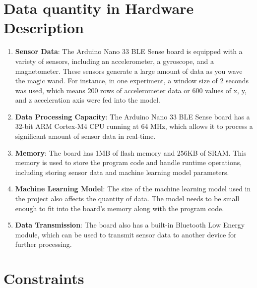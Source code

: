 \section{Data quantity in Hardware Description}

\begin{enumerate}
	\item \textbf{Sensor Data}: The Arduino Nano 33 BLE Sense board is equipped with a variety of sensors, including an accelerometer, a gyroscope, and a magnetometer. These sensors generate a large amount of data as you wave the magic wand. For instance, in one experiment, a window size of 2 seconds was used, which means 200 rows of accelerometer data or 600 values of x, y, and z acceleration axis were fed into the model. \cite{Miller:2022}
	
	\item \textbf{Data Processing Capacity}: The Arduino Nano 33 BLE Sense board has a 32-bit ARM Cortex-M4 CPU running at 64 MHz, which allows it to process a significant amount of sensor data in real-time.
	
	\item \textbf{Memory}: The board has 1MB of flash memory and 256KB of SRAM. This memory is used to store the program code and handle runtime operations, including storing sensor data and machine learning model parameters.
	
	\item \textbf{Machine Learning Model}: The size of the machine learning model used in the project also affects the quantity of data. The model needs to be small enough to fit into the board's memory along with the program code.
	
	\item \textbf{Data Transmission}: The board also has a built-in Bluetooth Low Energy module, which can be used to transmit sensor data to another device for further processing. \cite{TensorFlow:2023}
	
\end{enumerate}


\section{Constraints}
